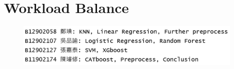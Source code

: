\section{Workload Balance}
\begin{figure}[h]
    \includegraphics[width=1\linewidth]{Pictures/Workkload.png}
\end{figure}
